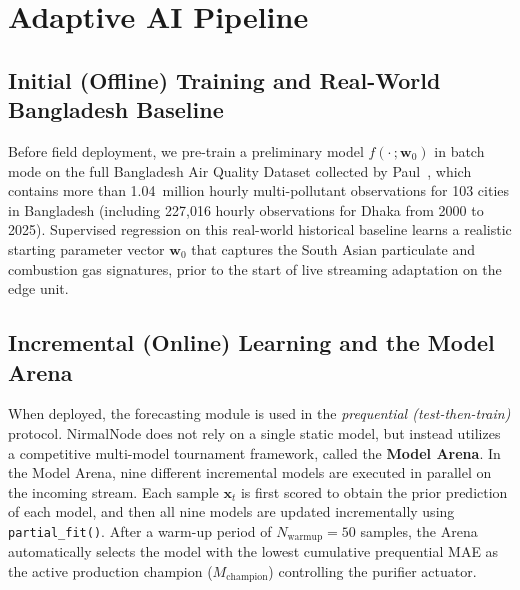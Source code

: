 \FloatBarrier

\section{Adaptive AI Pipeline}
\label{sec:meth-ai-pipeline}

\subsection{Initial (Offline) Training and Real-World Bangladesh Baseline}
Before field deployment, we pre-train a preliminary model $f(\cdot\,;\mathbf{w}_0)$ in batch mode on the full Bangladesh Air Quality Dataset collected by Paul~\cite{paul2026bangladesh}, which contains more than 1.04~million hourly multi-pollutant observations for 103 cities in Bangladesh (including 227,016 hourly observations for Dhaka from 2000 to 2025). Supervised regression on this real-world historical baseline learns a realistic starting parameter vector $\mathbf{w}_0$ that captures the South Asian particulate and combustion gas signatures, prior to the start of live streaming adaptation on the edge unit.
\subsection{Incremental (Online) Learning and the Model Arena}
When deployed, the forecasting module is used in the \emph{prequential (test-then-train)} protocol. NirmalNode does not rely on a single static model, but instead utilizes a competitive multi-model tournament framework, called the \textbf{Model Arena}. In the Model Arena, nine different incremental models are executed in parallel on the incoming stream. Each sample $\mathbf{x}_t$ is first scored to obtain the prior prediction of each model, and then all nine models are updated incrementally using \texttt{partial\_fit()}. After a warm-up period of $N_{\text{warmup}} = 50$ samples, the Arena automatically selects the model with the lowest cumulative prequential MAE as the active production champion ($M_{\text{champion}}$) controlling the purifier actuator.


